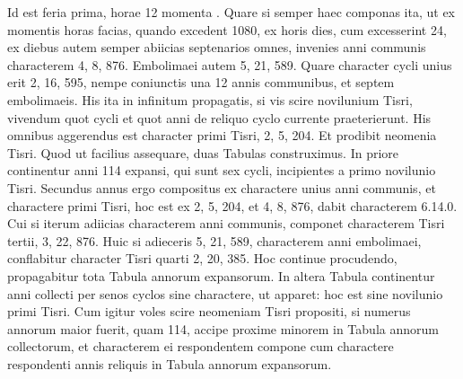 Id est feria prima, horae 12 momenta .
Quare si
semper haec componas ita, ut ex momentis horas facias, quando excedent
1080, ex horis dies, cum excesserint 24, ex diebus autem semper
abiicias septenarios omnes, invenies anni communis characterem 4, 8,
876.
Embolimaei %
 autem 5, 21, 589.
Quare character cycli unius erit 2,
16, 595, nempe coniunctis una 12 annis communibus, et septem embolimaeis.
His ita in infinitum propagatis, si vis scire novilunium Tisri,
vivendum quot cycli et quot anni de reliquo cyclo currente praeterierunt.
His omnibus aggerendus est character primi Tisri, 2, 5, 204.
Et prodibit neomenia Tisri.
Quod ut facilius assequare, duas Tabulas
construximus.
In priore continentur anni 114 expansi, qui
sunt sex cycli, incipientes a primo novilunio Tisri.
Secundus annus
ergo compositus ex charactere unius anni communis, et charactere
primi Tisri, hoc est ex 2, 5, 204, et 4, 8, 876, dabit characterem
6.14.0.
%
Cui si iterum adiicias characterem anni communis, componet
characterem Tisri tertii, 3, 22, 876.
Huic si adieceris 5, 21, 589,
characterem anni embolimaei, conflabitur character Tisri quarti
2, 20, 385.
Hoc continue procudendo, propagabitur tota Tabula
annorum expansorum.
In altera Tabula continentur anni collecti
per senos cyclos sine charactere, ut apparet: hoc est sine novilunio
primi Tisri.
Cum igitur voles scire neomeniam Tisri propositi,
si numerus annorum maior fuerit, quam 114, accipe proxime
minorem in Tabula annorum collectorum, et characterem ei
respondentem compone cum charactere respondenti annis reliquis
in Tabula annorum expansorum.

  
%

\begin{table}[tp]
  
\end{table}

\begin{table}[tp]
  
\end{table}


